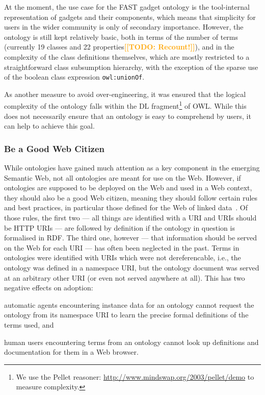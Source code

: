 \documentclass[twoside]{fast_latex}
\newcommand{\todo}[1]{\textsf{\textbf{\textcolor{Orange}{[[TODO: #1]]}}}}
\newcommand{\todo}[1]{}
\begin{document}
At the moment, the use case for the FAST gadget ontology is the tool-internal representation of gadgets and their components, which means that simplicity for users in the wider community is only of secondary importance. However, the ontology is still kept relatively basic, both in terms of the number of terms (currently 19 classes and 22 properties\todo{Recount!}), and in the complexity of the class definitions themselves, which are mostly restricted to a straightforward class subsumption hierarchy, with the exception of the sparse use of the boolean class expression \texttt{owl:unionOf}.

As another measure to avoid over-engineering, it was ensured that the logical complexity of the ontology falls within the DL fragment\footnote{We use the Pellet reasoner: \url{http://www.mindswap.org/2003/pellet/demo} to measure complexity.} of OWL. While this does not necessarily ensure that an ontology is easy to comprehend by users, it can help to achieve this goal.


\subsubsection{Be a Good Web Citizen} %
\label{ssub:be_a_good_web_citizen}

While ontologies have gained much attention as a key component in the emerging Semantic Web, not all ontologies are meant for use on the Web. However, if ontologies are supposed to be deployed on the Web and used in a Web context, they should also be a good Web citizen, meaning they should follow certain rules and best practices, in particular those defined for the Web of linked data~\cite{bernersLee2006linkedData}. Of those rules, the first two --- all things are identified with a URI and URIs should be HTTP URIs --- are followed by definition if the ontology in question is formalised in RDF. The third one, however --- that information should be served on the Web for each URI --- has often been neglected in the past. Terms in ontologies were identified with URIs which were not dereferencable, i.e., the ontology was defined in a namespace URI, but the ontology document was served at an arbitrary other URI (or even not served anywhere at all). This has two negative effects on adoption:
\begin{inparaenum}[(i)]
	\item automatic agents encountering instance data for an ontology cannot request the ontology from its namespace URI to learn the precise formal definitions of the terms used, and
	\item human users encountering terms from an ontology cannot look up definitions and documentation for them in a Web browser. 
\end{inparaenum}
\end{document}
